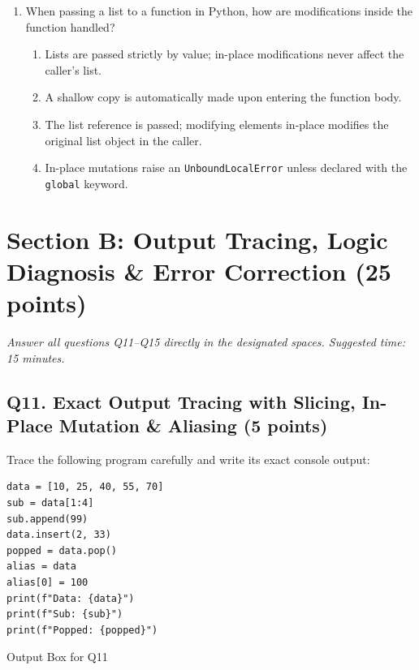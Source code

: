 \documentclass[11pt,a4paper]{article}
\begin{document}
\begin{enumerate}[label=\textbf{Q\arabic*.},leftmargin=2em,itemsep=1.5pt,topsep=1pt,resume]
\item When passing a list to a function in Python, how are modifications inside the function handled?
\begin{enumerate}[label=\Alph*.,leftmargin=2em]
  \item Lists are passed strictly by value; in-place modifications never affect the caller's list.
  \item A shallow copy is automatically made upon entering the function body.
  \item The list reference is passed; modifying elements in-place modifies the original list object in the caller.
  \item In-place mutations raise an \texttt{UnboundLocalError} unless declared with the \texttt{global} keyword.
\end{enumerate}

\end{enumerate}

\vspace{1mm}
\section*{Section B: Output Tracing, Logic Diagnosis \& Error Correction \hfill \normalsize\normalfont(25 points)}
\textit{Answer all questions Q11--Q15 directly in the designated spaces. Suggested time: 15 minutes.}

\subsection*{Q11. Exact Output Tracing with Slicing, In-Place Mutation \& Aliasing (5 points)}
Trace the following program carefully and write its exact console output:

\begin{lstlisting}
data = [10, 25, 40, 55, 70]
sub = data[1:4]
sub.append(99)
data.insert(2, 33)
popped = data.pop()
alias = data
alias[0] = 100
print(f"Data: {data}")
print(f"Sub: {sub}")
print(f"Popped: {popped}")
\end{lstlisting}

\begin{answerbox}[height=3.4cm]{Output Box for Q11}
\end{answerbox}

\newpage

\end{document}
